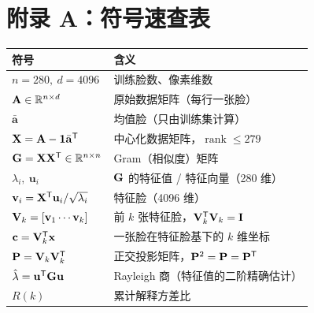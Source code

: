 \section*{附录 A：符号速查表}

\begin{center}
\begin{tabular}{ll}
\toprule
符号 & 含义 \\
\midrule
$n=280,\ d=4096$ & 训练脸数、像素维数 \\
$\mathbf{A}\in\mathbb{R}^{n\times d}$ & 原始数据矩阵（每行一张脸）\\
$\bar{\mathbf{a}}$ & 均值脸（只由训练集计算）\\
$\mathbf{X}=\mathbf{A}-\mathbf{1}\bar{\mathbf{a}}^{\mathsf{T}}$ & 中心化数据矩阵，$\operatorname{rank}\le 279$ \\
$\mathbf{G}=\mathbf{X}\mathbf{X}^{\mathsf{T}}\in\mathbb{R}^{n\times n}$ & Gram（相似度）矩阵 \\
$\lambda_i,\ \mathbf{u}_i$ & $\mathbf{G}$ 的特征值 / 特征向量（280 维）\\
$\mathbf{v}_i=\mathbf{X}^{\mathsf{T}}\mathbf{u}_i/\sqrt{\lambda_i}$ & 特征脸（4096 维）\\
$\mathbf{V}_k=[\mathbf{v}_1\cdots\mathbf{v}_k]$ & 前 $k$ 张特征脸，$\mathbf{V}_k^{\mathsf{T}}\mathbf{V}_k=\mathbf{I}$ \\
$\mathbf{c}=\mathbf{V}_k^{\mathsf{T}}\mathbf{x}$ & 一张脸在特征脸基下的 $k$ 维坐标 \\
$\mathbf{P}=\mathbf{V}_k\mathbf{V}_k^{\mathsf{T}}$ & 正交投影矩阵，$\mathbf{P}^2=\mathbf{P}=\mathbf{P}^{\mathsf{T}}$ \\
$\hat\lambda=\mathbf{u}^{\mathsf{T}}\mathbf{G}\mathbf{u}$ & Rayleigh 商（特征值的二阶精确估计）\\
$R(k)$ & 累计解释方差比 \\
\bottomrule
\end{tabular}
\end{center}
